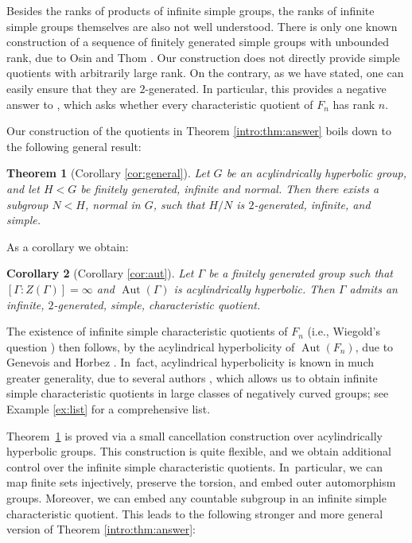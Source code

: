\documentclass[11pt]{article}
\newtheorem{theorem}{Theorem}[section]
\newtheorem{corollary}[theorem]{Corollary}
\theoremstyle{definition}
\newcommand{\Aut}{\operatorname{Aut}}
\begin{document}
Besides the ranks of products of infinite simple groups, the ranks of infinite simple groups themselves are also not well understood. There is only one known construction of a sequence of finitely generated simple groups with unbounded rank, due to Osin and Thom \cite{osinthom}.
Our construction does not directly provide simple quotients with arbitrarily large rank.
On the contrary, as we have stated, one can easily ensure that they are $2$-generated.
In particular, this provides a negative answer to \cite[Quest.\,17.62]{kourovka}, which asks whether every characteristic quotient of $F_n$ has rank $n$.

Our construction of the quotients in Theorem \ref{intro:thm:answer} boils down to the following general result:

\begin{theorem}[Corollary \ref{cor:general}]
\label{intro:thm:general}
Let $G$ be an acylindrically hyperbolic group, and let $H < G$ be finitely generated, infinite and normal. Then there exists a subgroup $N < H$, normal in $G$, such that $H/N$ is $2$-generated, infinite, and simple.
\end{theorem}

As a corollary we obtain:

\begin{corollary}[Corollary \ref{cor:aut}]
\label{intro:cor:aut}
Let $\Gamma$ be a finitely generated group such that \hbox{$[\Gamma : Z(\Gamma)] = \infty$} and $\Aut(\Gamma)$ is acylindrically hyperbolic. Then $\Gamma$ admits an infinite, $2$-generated, simple, characteristic quotient.
\end{corollary}

The existence of infinite simple characteristic quotients of $F_n$ (i.e., Wiegold's question \cite[Quest.\,6.45]{kourovka}) then follows, by the acylindrical hyperbolicity of $\Aut(F_n)$, due to Genevois and Horbez \cite{auto:infend}. In~fact, acylindrical hyperbolicity is known in much greater generality, due to several authors \cite{auto:graph2, auto:graph1, auto:oneend, auto:infend, escalierhorbez, auto:artin}, which allows us to obtain infinite simple characteristic quotients in large classes of negatively curved groups; see Example \ref{ex:list} for a comprehensive list.

Theorem~\ref{intro:thm:general} is proved via a small cancellation construction over acylindrically hyperbolic groups. This construction is quite flexible, and we obtain additional control over the infinite simple characteristic quotients. In~particular, we can map finite sets injectively, preserve the torsion, and embed outer automorphism groups. Moreover, we can embed any countable subgroup in an infinite simple characteristic quotient. This leads to the following stronger and more general version of Theorem \ref{intro:thm:answer}:
\end{document}
